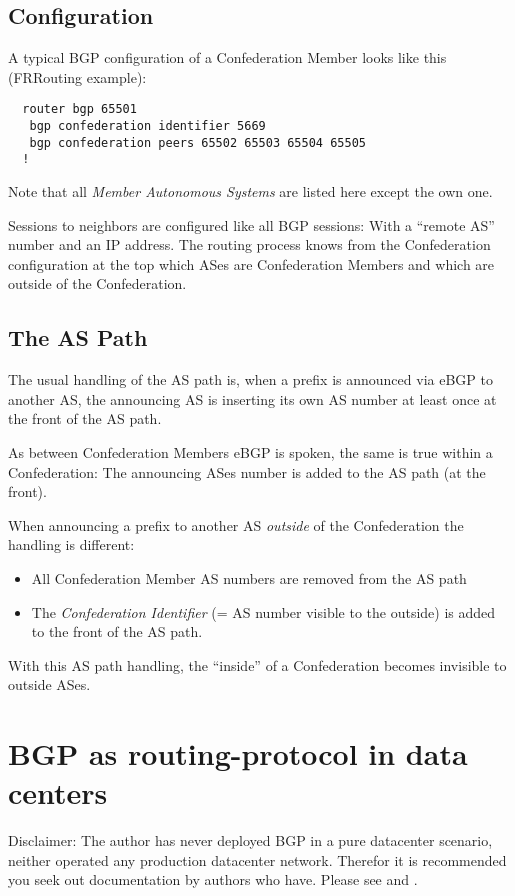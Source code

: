 \subsection{Configuration}
A typical BGP configuration of a Confederation Member looks like this (FRRouting example):
\begin{verbatim}
  router bgp 65501
   bgp confederation identifier 5669
   bgp confederation peers 65502 65503 65504 65505
  !
\end{verbatim}
Note that all \emph{Member Autonomous Systems} are listed here except the own one.

Sessions to neighbors are configured like all BGP sessions: With a ``remote AS'' number and an IP address. The routing process knows from the Confederation configuration at the top which ASes are Confederation Members and which are outside of the Confederation.

\subsection{The AS Path}
The usual handling of the AS path is, when a prefix is announced via eBGP to another AS, the announcing AS is inserting its own AS number at least once at the front of the AS path.

As between Confederation Members eBGP is spoken, the same is true within a Confederation: The announcing ASes number is added to the AS path (at the front).

When announcing a prefix to another AS \emph{outside} of the Confederation the handling is different:
\begin{itemize}
  \item All Confederation Member AS numbers are removed from the AS path
  \item The \emph{Confederation Identifier} (= AS number visible to the outside)  is added to the front of the AS path.
\end{itemize}
With this AS path handling, the ``inside'' of a Confederation becomes invisible to outside ASes.


\section{BGP as routing-protocol in data centers}
\label{se:datacenterrouting}
Disclaimer: The author has never deployed BGP in a pure datacenter scenario, neither operated any production datacenter network. Therefor it is recommended you seek out documentation by authors who have. Please
see  and \cite{BGPintheDataCenter}.
